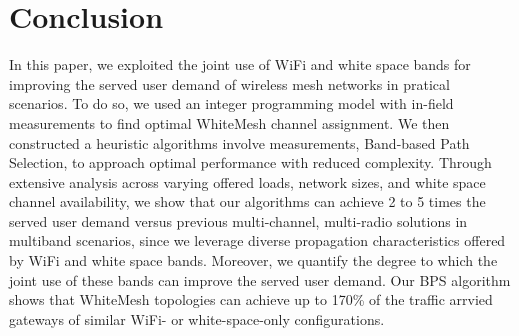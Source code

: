 \section{Conclusion}
\label{sec:conclusion}
In this paper, we exploited the joint use of WiFi and white space bands for 
improving the served user demand of wireless mesh networks in pratical scenarios.
To do so, we used an integer programming model with in-field measurements
 to find optimal WhiteMesh channel assignment.  
We then constructed a heuristic algorithms involve measurements, Band-based Path Selection, to 
approach optimal performance with reduced complexity. Through 
extensive analysis across varying offered loads, network sizes, and white space 
channel availability, we show that our algorithms can achieve 2 to 5 times the served
user demand versus previous multi-channel, multi-radio solutions in multiband scenarios, 
since we leverage diverse propagation characteristics offered by WiFi and white space bands.  Moreover,
we quantify the degree to which the joint use of these bands can improve the served
user demand. Our BPS algorithm shows that WhiteMesh topologies can achieve up to 
170\% of the traffic arrvied gateways of similar WiFi- or white-space-only configurations.

